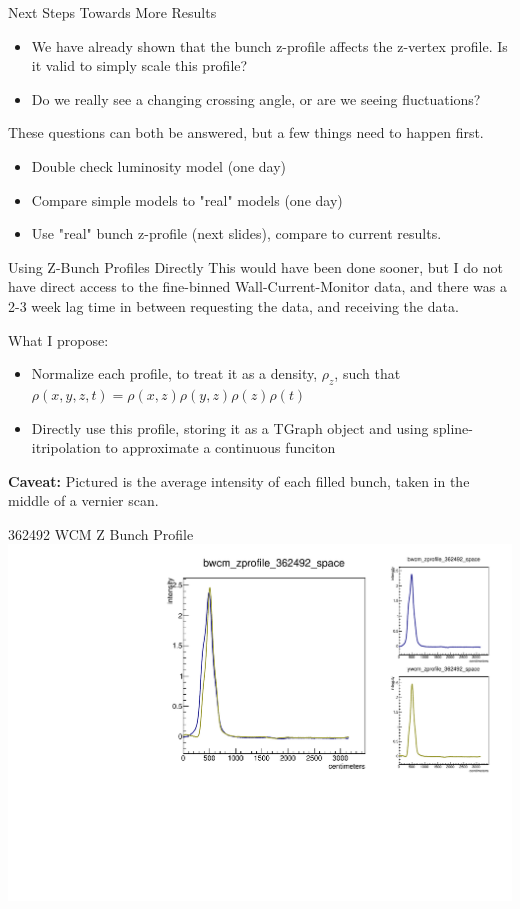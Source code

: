 \begin{frame}{Next Steps Towards More Results}
\begin{itemize}
\item We have already shown that the bunch z-profile affects the z-vertex profile. Is it valid to simply scale this profile?
\item Do we really see a changing crossing angle, or are we seeing fluctuations?
\end{itemize}
These questions can both be answered, but a few things need to happen first.
\begin{itemize}
\item Double check luminosity model (one day)
\item Compare simple models to "real" models (one day)
\item Use "real" bunch z-profile (next slides), compare to current results.
\end{itemize}
\end{frame}

\begin{frame}{Using Z-Bunch Profiles Directly}
This would have been done sooner, but I do not have direct access to the
fine-binned Wall-Current-Monitor data, and there was a 2-3 week lag time in
between requesting the data, and receiving the data.

What I propose:
\begin{itemize}
\item Normalize each profile, to treat it as a density, $\rho_{z}$, such that $\rho(x,y,z,t) = \rho(x,z)\rho(y,z)\rho(z)\rho(t)$
\item Directly use this profile, storing it as a TGraph object and using spline-itripolation to approximate a continuous funciton
\end{itemize}
\textbf{Caveat:} Pictured is the average intensity of each filled bunch, taken
in the middle of a vernier scan.
\end{frame}

\begin{frame}{362492 WCM Z Bunch Profile}
\includegraphics[width=\linewidth,height=\textheight,keepaspectratio]{../HourglassResults/figs/362492_wcm_zprofile.pdf}
\end{frame}

